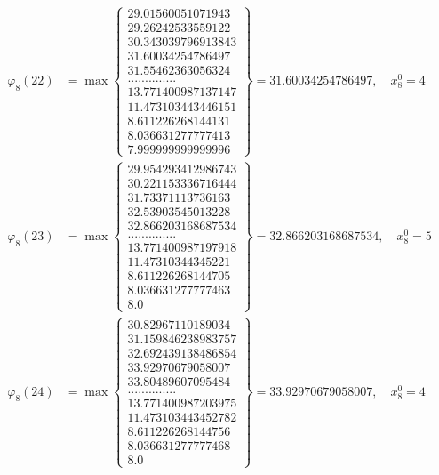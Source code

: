 \documentclass{article}
\begin{document}
\begin{align*}
  
  
  
\varphi_{8}(22) &= \max \left\{ \begin{array}{c}
29.01560051071943 \\
 29.26242533559122 \\
 30.343039796913843 \\
 31.60034254786497 \\
 31.55462363056324 \\
 .............. \\
 13.771400987137147 \\
 11.473103443446151 \\
 8.611226268144131 \\
 8.036631277777413 \\
 7.999999999999996
\end{array} \right\} = 31.60034254786497, \quad x_{8}^0 = 4\\
  
  
  
  
\varphi_{8}(23) &= \max \left\{ \begin{array}{c}
29.954293412986743 \\
 30.221153336716444 \\
 31.73371113736163 \\
 32.53903545013228 \\
 32.866203168687534 \\
 .............. \\
 13.771400987197918 \\
 11.47310344345221 \\
 8.611226268144705 \\
 8.036631277777463 \\
 8.0
\end{array} \right\} = 32.866203168687534, \quad x_{8}^0 = 5\\
  
  
  
  
\varphi_{8}(24) &= \max \left\{ \begin{array}{c}
30.82967110189034 \\
 31.159846238983757 \\
 32.692439138486854 \\
 33.92970679058007 \\
 33.80489607095484 \\
 .............. \\
 13.771400987203975 \\
 11.473103443452782 \\
 8.611226268144756 \\
 8.036631277777468 \\
 8.0
\end{array} \right\} = 33.92970679058007, \quad x_{8}^0 = 4\\
  

\end{align*}
\end{document}
